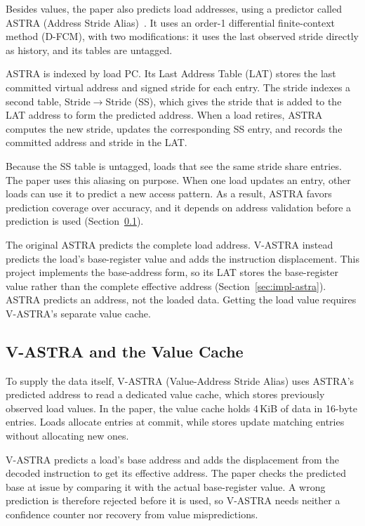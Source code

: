 Besides values, the paper also predicts load addresses, using a
predictor called ASTRA (Address Stride Alias)~\cite{ravenel2025architecting}. It uses an order-1 differential
finite-context method (D-FCM), with two modifications: it uses the
last observed stride directly as history, and its tables are untagged.

ASTRA is indexed by load PC. Its Last Address Table (LAT) stores
the last committed virtual address and signed stride for each
entry. The stride indexes a second table, Stride$\rightarrow$Stride
(SS), which gives the stride that is added to the LAT address to
form the predicted address. When a load retires, ASTRA computes the
new stride, updates the corresponding SS entry, and records the
committed address and stride in the LAT.

Because the SS table is untagged, loads that see the same stride
share entries. The paper uses this aliasing on purpose. When one
load updates an entry, other loads can use it to predict a new
access pattern. As a result, ASTRA favors prediction
coverage over accuracy, and it depends on address validation before
a prediction is used (Section~\ref{sec:bg-vastra}).

The original ASTRA predicts the complete load address. V-ASTRA
instead predicts the load's base-register value and adds the
instruction displacement. This project implements the base-address
form, so its LAT stores the base-register value rather than the
complete effective address (Section~\ref{sec:impl-astra}). ASTRA
predicts an address, not the loaded data. Getting the load value
requires V-ASTRA's separate value cache.

\subsection{V-ASTRA and the Value Cache}
\label{sec:bg-vastra}

To supply the data itself, V-ASTRA (Value-Address Stride Alias)
uses ASTRA's predicted address to read a dedicated value cache, which
stores previously observed load values. In the paper, the value cache holds 4\,KiB of data
in 16-byte entries. Loads allocate entries at commit, while stores
update matching entries without allocating new ones.

V-ASTRA predicts a load's base address and adds the displacement
from the decoded instruction to get its effective address.
The paper checks the predicted base at issue by comparing it
with the actual base-register value. A wrong prediction is
therefore rejected before it is used, so V-ASTRA needs neither a
confidence counter nor recovery from value mispredictions.


